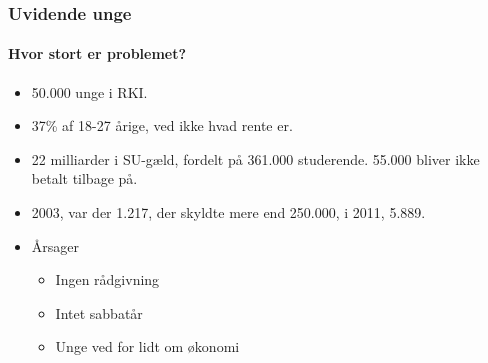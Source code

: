 
\begin{frame}
\frametitle{Uvidende unge}
\framesubtitle{Hvor stort er problemet?} %
    \begin{itemize}
        \item{50.000 unge i RKI.}
        \item{37\% af 18-27 årige, ved ikke hvad rente er.}
        \item{22 milliarder i SU-gæld, fordelt på 361.000 studerende. 55.000 bliver ikke betalt tilbage på.}
        \item{2003, var der 1.217, der skyldte mere end 250.000, i 2011, 5.889.}
        \item{Årsager}
        	\begin{itemize}
        	\item{Ingen rådgivning}
        	\item{Intet sabbatår}
        	\item{Unge ved for lidt om økonomi}
        	\end{itemize}
    \end{itemize}
\end{frame}

